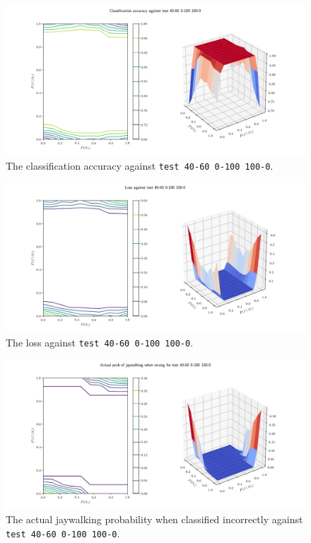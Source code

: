 \documentclass[]{report}
\newcommand{\code}{\texttt}
\begin{document}
% 
% 

\begin{figure}[h]
    \centering
    \centerline{\includegraphics[scale=0.55]{test_40-60_0-100_100-0_accuracy.png}}
    \caption[]{The classification accuracy against \code{test 40-60 0-100 100-0}.}
    \label{fig:test_40-60_0-100_100-0_accuracy_plot}
\end{figure}

\begin{figure}[h]
    \centering
    \centerline{\includegraphics[scale=0.55]{test_40-60_0-100_100-0_loss.png}}
    \caption[]{The loss against \code{test 40-60 0-100 100-0}.}
    \label{fig:test_40-60_0-100_100-0_loss_plot}
\end{figure}

\begin{figure}[h]
    \centering
    \centerline{\includegraphics[scale=0.55]{test_40-60_0-100_100-0_jay_prob.png}}
    \caption[]{The actual jaywalking probability when classified incorrectly against \code{test 40-60 0-100 100-0}.}
    \label{fig:test_40-60_0-100_100-0_jay_prob_plot}
\end{figure}
\end{document}
